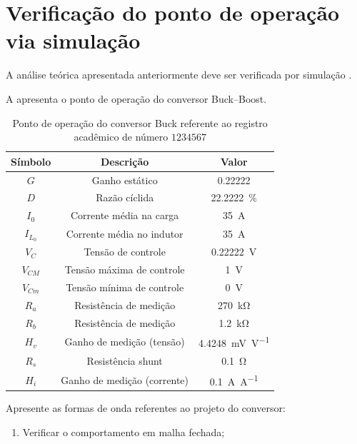 \section{Verificação do ponto de operação via simulação}

A análise teórica apresentada anteriormente deve ser verificada por simulação \cite{noauthor_psim_nodate}.

A  apresenta o ponto de operação do conversor Buck--Boost.

\begin{table}[!ht]
	\centering
	\caption{Ponto de operação do conversor Buck referente ao registro acadêmico de número $1234567$}
	\label{tab:steadystate}
	\begin{tabular}{@{}ccc@{}}
		\toprule
		\textbf{Símbolo} & \textbf{Descrição} & \textbf{Valor}\\ \midrule
		$G$ & Ganho estático & \SI{0.22222}{}\\
		$D$ & Razão cíclida  & \SI{22.2222}{\%}\\
		$I_0$ & Corrente média na carga  & \SI{35}{\A} \\
		$I_{L_0}$ & Corrente média no indutor & \SI{35}{\A} \\
		$V_C$ & Tensão de controle  & \SI{0.22222}{\V} \\
		$V_{CM}$ & Tensão máxima de controle  & \SI{1}{\V} \\
		$V_{Cm}$ & Tensão mínima de controle  & \SI{0}{\V} \\
		$R_a$ & Resistência de medição & \SI{270}{\kilo\ohm} \\
		$R_b$ & Resistência de medição & \SI{1.2}{\kilo\ohm} \\
		$H_v$ & Ganho de medição (tensão) & \SI{4.4248}{\milli\V\per\V} \\
		$R_s$ & Resistência shunt & \SI{0.1}{\ohm} \\
		$H_i$ & Ganho de medição (corrente) & \SI{0.1}{\A\per\A} \\
		\bottomrule
	\end{tabular}
\end{table}


									
 Apresente as formas de onda referentes ao projeto do conversor:
 
\begin{enumerate}
	\item Verificar o comportamento em malha fechada;
\end{enumerate}


